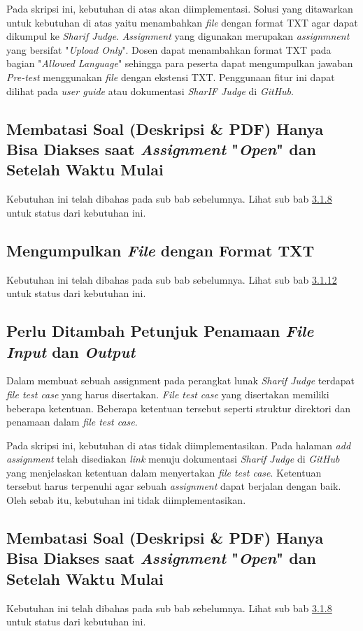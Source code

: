 Pada skripsi ini, kebutuhan di atas akan diimplementasi. Solusi yang ditawarkan untuk kebutuhan di atas yaitu menambahkan \textit{file} dengan format TXT agar dapat dikumpul ke \textit{Sharif Judge}. \textit{Assignment} yang digunakan merupakan \textit{assignmnent} yang bersifat "\textit{Upload Only}". Dosen dapat menambahkan format TXT pada bagian "\textit{Allowed Language}" sehingga para peserta dapat mengumpulkan jawaban \textit{Pre-test} menggunakan \textit{file} dengan ekstensi TXT. Penggunaan fitur ini dapat dilihat pada \textit{user guide} atau dokumentasi \textit{SharIF Judge} di \textit{GitHub}.

\subsection{Membatasi Soal (Deskripsi \& PDF) Hanya Bisa Diakses saat \textit{Assignment} "\textit{Open}" dan Setelah Waktu Mulai}
Kebutuhan ini telah dibahas pada sub bab sebelumnya. Lihat sub bab \hyperref[subsec:membatasisoal]{3.1.8} untuk status dari kebutuhan ini.

\subsection{Mengumpulkan \textit{File} dengan Format TXT}
Kebutuhan ini telah dibahas pada sub bab sebelumnya. Lihat sub bab \hyperref[subsec:filetxt]{3.1.12} untuk status dari kebutuhan ini.

\subsection{Perlu Ditambah Petunjuk Penamaan \textit{File} \textit{Input} dan \textit{Output}}
Dalam membuat sebuah assignment pada perangkat lunak \textit{Sharif Judge} terdapat \textit{file test case} yang harus disertakan. \textit{File test case} yang disertakan memiliki beberapa ketentuan. Beberapa ketentuan tersebut seperti struktur direktori dan penamaan dalam \textit{file test case}. 

Pada skripsi ini, kebutuhan di atas tidak diimplementasikan. Pada halaman \textit{add assignment} telah disediakan \textit{link} menuju dokumentasi \textit{Sharif Judge} di \textit{GitHub} yang menjelaskan ketentuan dalam menyertakan \textit{file test case}. Ketentuan tersebut harus terpenuhi agar sebuah \textit{assignment} dapat berjalan dengan baik. Oleh sebab itu, kebutuhan ini tidak diimplementasikan.

\subsection{Membatasi Soal (Deskripsi \& PDF) Hanya Bisa Diakses saat \textit{Assignment} "\textit{Open}" dan Setelah Waktu Mulai}
Kebutuhan ini telah dibahas pada sub bab sebelumnya. Lihat sub bab \hyperref[subsec:membatasisoal]{3.1.8} untuk status dari kebutuhan ini.

